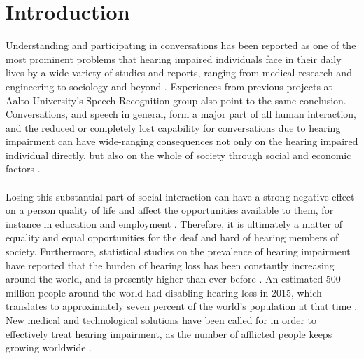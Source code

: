 \documentclass[english, 12pt, a4paper, pdftex, elec, utf8]{aaltothesis}
\begin{document}

\cleardoublepage
\storeinipagenumber
{}
\setcounter{page}{1}

\section{Introduction}

Understanding and participating in conversations has been reported as one of the most prominent problems that hearing impaired individuals face in their daily lives by a wide variety of studies and reports, ranging from medical research and engineering to sociology and beyond \cite{moore2007cochlear, peterson2010cochlear, wilson2017global, ohlenforst2017effects, stacey2006hearing, healy2016difficulty, hietala2008huonokuuloinen, koskela2013kuulokojeen, lavikainen2014, blomberg2012sisakorvaistutetta, haatainen2013viestintahaasteet}. Experiences from previous projects at Aalto University's Speech Recognition group also point to the same conclusion. Conversations, and speech in general, form a major part of all human interaction, and the reduced or completely lost capability for conversations due to hearing impairment can have wide-ranging consequences not only on the hearing impaired individual directly, but also on the whole of society through social and economic factors \cite{koskela2013kuulokojeen, stacey2006hearing}. \\\\
Losing this substantial part of social interaction can have a strong negative effect on a person quality of life and affect the opportunities available to them, for instance in education and employment \cite{hietala2008huonokuuloinen, lavikainen2014}. Therefore, it is ultimately a matter of equality and equal opportunities for the deaf and hard of hearing members of society. Furthermore, statistical studies on the prevalence of hearing impairment have reported that the burden of hearing loss has been constantly increasing around the world, and is presently higher than ever before \cite{mathers2000global, wilson2017global}. An estimated 500 million people around the world had disabling hearing loss in 2015, which translates to approximately seven percent of the world’s population at that time \cite{wilson2017global}. New medical and technological solutions have been called for in order to effectively treat hearing impairment, as the number of afflicted people keeps growing worldwide \cite{wilson2017global}. \\\\
\end{document}
